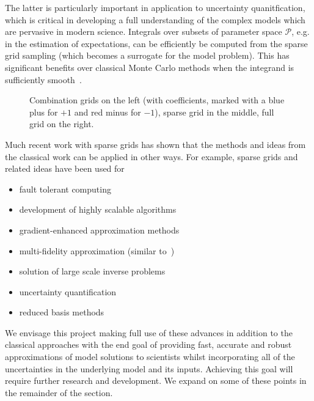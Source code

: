 \documentclass[a4paper,fontsize=12pt]{scrartcl}
\begin{document}
The latter is particularly important in application to uncertainty
quanitfication, which is critical in developing a full understanding
of the complex models which are pervasive in modern science. Integrals
over subsets of parameter space $\mathcal{P}$, e.g. in the estimation
of expectations, can be efficiently be computed from the sparse grid
sampling (which becomes a surrogate for the model problem). This has
significant benefits over classical Monte Carlo methods when the
integrand is sufficiently
smooth~\parencite{JakemanRoberts2013,FranzelinDiehlPfluger2014}.

\begin{figure}[h!]
\centering

\caption{Combination grids on the left (with coefficients, marked with
  a blue plus for $+1$ and red minus for $-1$), sparse grid in the
  middle, full grid on the right.}
\end{figure}


Much recent work with sparse grids has shown that the methods and ideas
from the classical work can be applied in other ways.
For example, sparse grids and related ideas have been used for
\begin{itemize}
\item fault tolerant computing~\parencite{HardingHLS2015,AliEtal2015}
\item development of highly scalable algorithms~\parencite{StrazdinsEtal2015}
\item gradient-enhanced approximation methods~\parencite{deBaarHarding2015,Jakeman2015}
\item multi-fidelity approximation (similar to~\parencite{deBaarRDM2015}) 
\item solution of large scale inverse problems~\parencite{Zabaras2010}
\item uncertainty quantification~\parencite{JakemanRoberts2013,FranzelinDiehlPfluger2014}
\item reduced basis methods~\parencite{Peherstorfer2013,ChenSchwab2015}
\end{itemize}
We envisage this project making full use of these advances in addition 
to the classical approaches with the end goal of providing fast, accurate
and robust approximations of model solutions to scientists whilst 
incorporating all of the uncertainties in the underlying model and its inputs. 
Achieving this goal will require further research and development.
We expand on some of these points in the remainder of the section.
\end{document}
